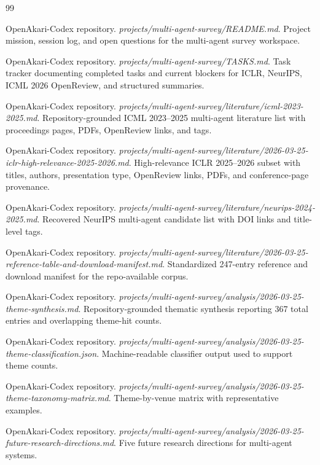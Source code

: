 \documentclass[11pt]{article}
\begin{document}
\begin{thebibliography}{99}

OpenAkari-Codex repository. \emph{projects/multi-agent-survey/README.md}. Project mission, session log, and open questions for the multi-agent survey workspace.

OpenAkari-Codex repository. \emph{projects/multi-agent-survey/TASKS.md}. Task tracker documenting completed tasks and current blockers for ICLR, NeurIPS, ICML 2026 OpenReview, and structured summaries.

OpenAkari-Codex repository. \emph{projects/multi-agent-survey/literature/icml-2023-2025.md}. Repository-grounded ICML 2023--2025 multi-agent literature list with proceedings pages, PDFs, OpenReview links, and tags.

OpenAkari-Codex repository. \emph{projects/multi-agent-survey/literature/2026-03-25-iclr-high-relevance-2025-2026.md}. High-relevance ICLR 2025--2026 subset with titles, authors, presentation type, OpenReview links, PDFs, and conference-page provenance.

OpenAkari-Codex repository. \emph{projects/multi-agent-survey/literature/neurips-2024-2025.md}. Recovered NeurIPS multi-agent candidate list with DOI links and title-level tags.

OpenAkari-Codex repository. \emph{projects/multi-agent-survey/literature/2026-03-25-reference-table-and-download-manifest.md}. Standardized 247-entry reference and download manifest for the repo-available corpus.

OpenAkari-Codex repository. \emph{projects/multi-agent-survey/analysis/2026-03-25-theme-synthesis.md}. Repository-grounded thematic synthesis reporting 367 total entries and overlapping theme-hit counts.

OpenAkari-Codex repository. \emph{projects/multi-agent-survey/analysis/2026-03-25-theme-classification.json}. Machine-readable classifier output used to support theme counts.

OpenAkari-Codex repository. \emph{projects/multi-agent-survey/analysis/2026-03-25-theme-taxonomy-matrix.md}. Theme-by-venue matrix with representative examples.

OpenAkari-Codex repository. \emph{projects/multi-agent-survey/analysis/2026-03-25-future-research-directions.md}. Five future research directions for multi-agent systems.


\end{thebibliography}
\end{document}
